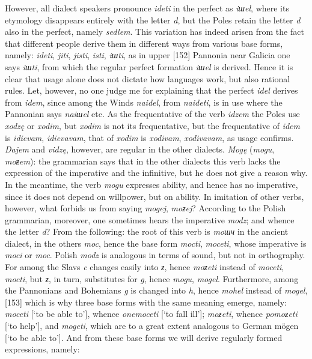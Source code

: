 However, all dialect speakers pronounce \textit{ideti} in the perfect as \textit{iшel}, where its etymology disappears entirely with the letter \textit{d}, but the Poles retain the letter \textit{d} also in the perfect, namely \textit{sedlem}. This variation has indeed arisen from the fact that different people derive them in different ways from various base forms, namely: \textit{ideti}, \textit{jiti}, \textit{jisti}, \textit{isti}, \textit{iшti}, as in upper [152] Pannonia near Galicia one says \textit{iшti}, from which the regular perfect formation \textit{iшel} is derived. Hence it is clear that usage alone does not dictate how languages work, but also rational rules. Let, however, no one judge me for explaining that the perfect \textit{idel} derives from \textit{idem}, since among the Winds \textit{naidel}, from \textit{naideti}, is in use where the Pannonian says \textit{naiшel} etc. As the frequentative of the verb \textit{idzem} the Poles use \textit{xodzę} or \textit{xodim}, but \textit{xodim} is not its frequentative, but the frequentative of \textit{idem} is \textit{idievam}, \textit{idievavam}, that of \textit{xodim} is \textit{xodivam}, \textit{xodivavam}, as usage confirms. \textit{Dajem} and \textit{vidzę}, however, are regular in the other dialects. \textit{Mogę} (\textit{mogu}, \textit{moƶem}): the grammarian says that in the other dialects this verb lacks the expression of the imperative and the infinitive, but he does not give a reason why. In the meantime, the verb \textit{mogu} expresses ability, and hence has no imperative, since it does not depend on willpower, but on ability. In imitation of other verbs, however, what forbids us from saying \textit{mogej}, \textit{moƶej}? According to the Polish grammarian, moreover, one sometimes hears the imperative \textit{modz}; and whence the letter \textit{d}? From the following: the root of this verb is \textit{moшч} in the ancient dialect, in the others \textit{moc}, hence the base form \textit{mocti}, \textit{moceti}, whose imperative is \textit{moci} or \textit{moc}. Polish \textit{modz} is analogous in terms of sound, but not in orthography. For among the Slavs \textit{c} changes easily into \textit{ƶ}, hence \textit{moƶeti} instead of \textit{moceti}, \textit{mocti}, but \textit{ƶ}, in turn, substitutes for \textit{g}, hence \textit{mogu}, \textit{mogel}. Furthermore, among the Pannonians and Bohemians \textit{g} is changed into \textit{h}, hence \textit{mohel} instead of \textit{mogel}, [153] which is why three base forms with the same meaning emerge, namely: \textit{moceti} [‘to be able to’], whence \textit{onemoceti} [‘to fall ill’]; \textit{moƶeti}, whence \textit{pomoƶeti} [‘to help’], and \textit{mogeti}, which are to a great extent analogous to German {\wieynk mögen}  [‘to be able to’]. And from these base forms we will derive regularly formed expressions, namely:

